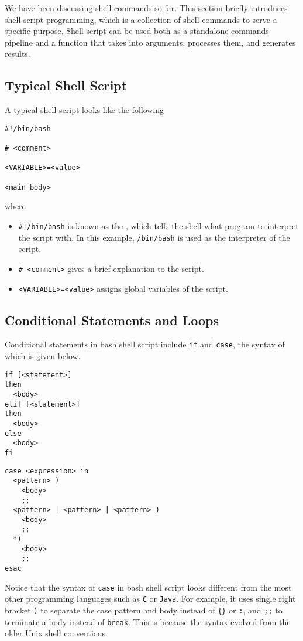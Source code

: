 We have been discussing shell commands so far. This section briefly introduces shell script programming, which is a collection of shell commands to serve a specific purpose. Shell script can be used both as a standalone commands pipeline and a function that takes into arguments, processes them, and generates results.

\subsection{Typical Shell Script}

A typical shell script looks like the following
\begin{lstlisting}
#!/bin/bash

# <comment>

<VARIABLE>=<value>

<main body>
\end{lstlisting}
where
\begin{itemize}
  \item \verb|#!/bin/bash| is known as the , which tells the shell what program to interpret the script with. In this example, \verb|/bin/bash| is used as the interpreter of the script.
  \item \verb|# <comment>| gives a brief explanation to the script.
  \item \verb|<VARIABLE>=<value>| assigns global variables of the script.
\end{itemize}

\subsection{Conditional Statements and Loops}

Conditional statements in bash shell script include \verb|if| and \verb|case|, the syntax of which is given below.

\begin{lstlisting}
if [<statement>]
then
  <body>
elif [<statement>]
then
  <body>
else
  <body>
fi
\end{lstlisting} 

\begin{lstlisting}
case <expression> in
  <pattern> )
    <body>
    ;;
  <pattern> | <pattern> | <pattern> )
    <body>
    ;;
  *)
    <body>
    ;;
esac
\end{lstlisting}

Notice that the syntax of \verb|case| in bash shell script looks different from the most other programming languages such as \verb|C| or \verb|Java|. For example, it uses single right bracket \verb|)| to separate the case pattern and body instead of \verb|{}| or \verb|:|, and \verb|;;| to terminate a body instead of \verb|break|. This is because the syntax evolved from the older Unix shell conventions.

